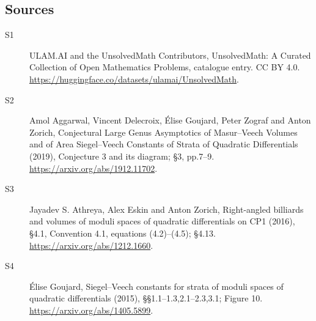 \documentclass[11pt]{article}
\begin{document}
\subsection{Sources}
\begin{description}
\item[\hypertarget{source:statement:1}{S1}] ULAM.AI and the UnsolvedMath Contributors, UnsolvedMath: A Curated Collection of Open Mathematics Problems, catalogue entry. CC BY 4.0. \url{https://huggingface.co/datasets/ulamai/UnsolvedMath}.
\item[\hypertarget{source:statement:2}{S2}] Amol Aggarwal, Vincent Delecroix, Élise Goujard, Peter Zograf and Anton Zorich, Conjectural Large Genus Asymptotics of Masur–Veech Volumes and of Area Siegel–Veech Constants of Strata of Quadratic Differentials (2019), Conjecture 3 and its diagram; §3, pp.7–9. \url{https://arxiv.org/abs/1912.11702}.
\item[\hypertarget{source:statement:3}{S3}] Jayadev S. Athreya, Alex Eskin and Anton Zorich, Right-angled billiards and volumes of moduli spaces of quadratic differentials on CP1 (2016), §4.1, Convention 4.1, equations (4.2)–(4.5); §4.13. \url{https://arxiv.org/abs/1212.1660}.
\item[\hypertarget{source:statement:4}{S4}] Élise Goujard, Siegel–Veech constants for strata of moduli spaces of quadratic differentials (2015), §§1.1–1.3,2.1–2.3,3.1; Figure 10. \url{https://arxiv.org/abs/1405.5899}.
\end{description}
\label{end:statement}
\end{document}
